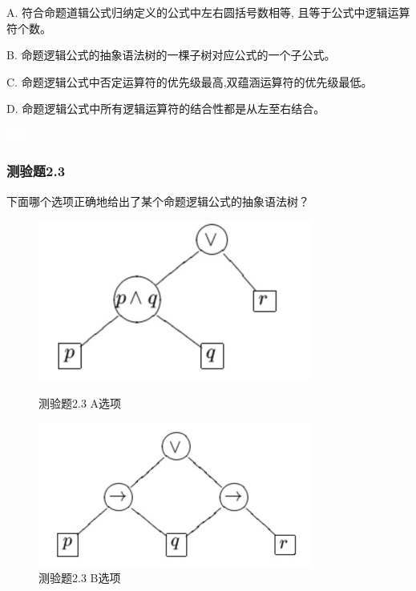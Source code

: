 \documentclass[UTF8, heading=true]{ctexart}
\begin{document}
A. 符合命题道辑公式归纳定义的公式中左右圆括号数相等, 且等于公式中逻辑运算符个数。

B. 命题逻辑公式的抽象语法树的一棵子树对应公式的一个子公式。

C. 命题逻辑公式中否定运算符的优先级最高,双蕴涵运算符的优先级最低。

D. 命题逻辑公式中所有逻辑运算符的结合性都是从左至右结合。

\textcolor{white}{答案：D}

\subsubsection{测验题2.3}

下面哪个选项正确地给出了某个命题逻辑公式的抽象语法树？

\begin{figure}[H]
    \centering
    \begin{minipage}[t]{0.45\textwidth}
        \centering
        \includegraphics[width=0.8\textwidth]{2.3_1.jpg} %
        \caption{测验题2.3 A选项}
    \end{minipage}
    \hfill
    \begin{minipage}[t]{0.45\textwidth}
        \centering
        \includegraphics[width=0.8\textwidth]{2.3_2.jpg} %
        \caption{测验题2.3 B选项}
\end{minipage}
\end{figure}
\end{document}

